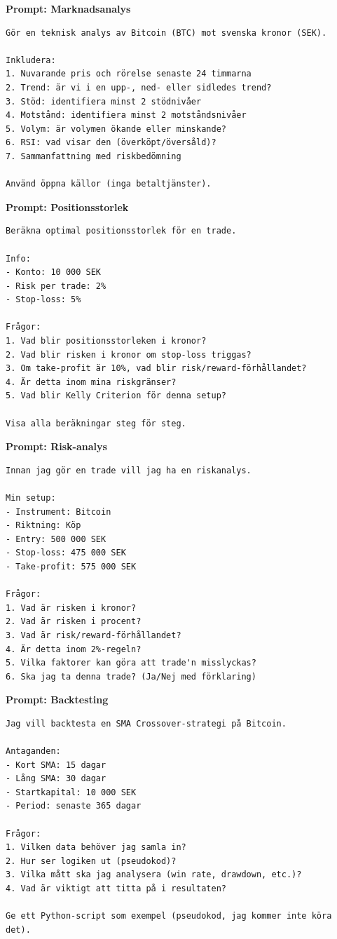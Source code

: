 \documentclass[12pt,a4paper,swedish]{article}
\begin{document}
\textbf{Prompt: Marknadsanalys}
\begin{lstlisting}[style=latex]
Gör en teknisk analys av Bitcoin (BTC) mot svenska kronor (SEK).

Inkludera:
1. Nuvarande pris och rörelse senaste 24 timmarna
2. Trend: är vi i en upp-, ned- eller sidledes trend?
3. Stöd: identifiera minst 2 stödnivåer
4. Motstånd: identifiera minst 2 motståndsnivåer
5. Volym: är volymen ökande eller minskande?
6. RSI: vad visar den (överköpt/översåld)?
7. Sammanfattning med riskbedömning

Använd öppna källor (inga betaltjänster).
\end{lstlisting}

\bigskip

\textbf{Prompt: Positionsstorlek}
\begin{lstlisting}[style=latex]
Beräkna optimal positionsstorlek för en trade.

Info:
- Konto: 10 000 SEK
- Risk per trade: 2%
- Stop-loss: 5%

Frågor:
1. Vad blir positionsstorleken i kronor?
2. Vad blir risken i kronor om stop-loss triggas?
3. Om take-profit är 10%, vad blir risk/reward-förhållandet?
4. Är detta inom mina riskgränser?
5. Vad blir Kelly Criterion för denna setup?

Visa alla beräkningar steg för steg.
\end{lstlisting}

\bigskip

\textbf{Prompt: Risk-analys}
\begin{lstlisting}[style=latex]
Innan jag gör en trade vill jag ha en riskanalys.

Min setup:
- Instrument: Bitcoin
- Riktning: Köp
- Entry: 500 000 SEK
- Stop-loss: 475 000 SEK
- Take-profit: 575 000 SEK

Frågor:
1. Vad är risken i kronor?
2. Vad är risken i procent?
3. Vad är risk/reward-förhållandet?
4. Är detta inom 2%-regeln?
5. Vilka faktorer kan göra att trade'n misslyckas?
6. Ska jag ta denna trade? (Ja/Nej med förklaring)
\end{lstlisting}

\bigskip

\textbf{Prompt: Backtesting}
\begin{lstlisting}[style=latex]
Jag vill backtesta en SMA Crossover-strategi på Bitcoin.

Antaganden:
- Kort SMA: 15 dagar
- Lång SMA: 30 dagar
- Startkapital: 10 000 SEK
- Period: senaste 365 dagar

Frågor:
1. Vilken data behöver jag samla in?
2. Hur ser logiken ut (pseudokod)?
3. Vilka mått ska jag analysera (win rate, drawdown, etc.)?
4. Vad är viktigt att titta på i resultaten?

Ge ett Python-script som exempel (pseudokod, jag kommer inte köra det).
\end{lstlisting}
\end{document}
